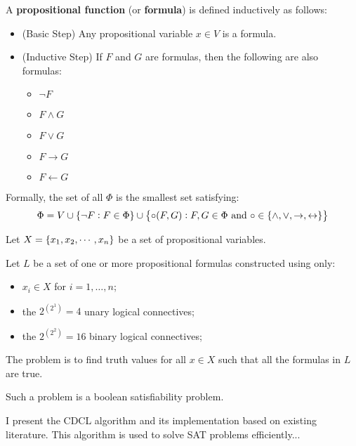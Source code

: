 \begin{tcolorbox}[colframe=defcolor,title={\color{white}\bf Propositional Function (Formula)}]
\begin{definition}
A \textbf{propositional function} (or \textbf{formula}) is defined inductively as follows:
\begin{itemize}
	\item[] (Basic Step) Any propositional variable $x\in V$ is a formula.
	\item[] (Inductive Step) If $F$ and $G$ are formulas, then the following are also formulas:
	\begin{itemize}
		\item $\lnot F$
		\item $F\land G$
		\item $F\lor G$
		\item $F\rightarrow G$
		\item $F\leftarrow G$
	\end{itemize}
\end{itemize}
Formally, the set of all $\Phi$ is the smallest set satisfying: \[
\Phi = V\cup\set{\lnot F:F\in\Phi}\cup\set{\circ(F,G):F,G\in\Phi\ \text{and}\ \circ\in\set{\land,\lor,\rightarrow,\leftrightarrow}}
\]
\end{definition}
\end{tcolorbox}

\begin{tcolorbox}[colframe=defcolor,title={\color{white}\bf Boolean Satisfiability Problem (SAT)}]
\begin{definition}
Let $X=\set{x_1,x_2,\cdots, x_n}$ be a set of propositional variables.

Let $L$ be a set of one or more propositional formulas constructed using only:
\begin{itemize}
	\item $x_i\in X$ for $i=1,\dots,n$;
	\item the $2^{(2^1)}=4$ unary logical connectives;
	\item the $2^{(2^2)}=16$ binary logical connectives;
\end{itemize}
The problem is to find truth values for all $x\in X$
such that all the formulas in $L$ are true.

Such a problem is a boolean satisfiability problem.
\end{definition}
\end{tcolorbox}


	I present the CDCL algorithm and its implementation based on existing literature. This algorithm is used to solve SAT problems efficiently...

